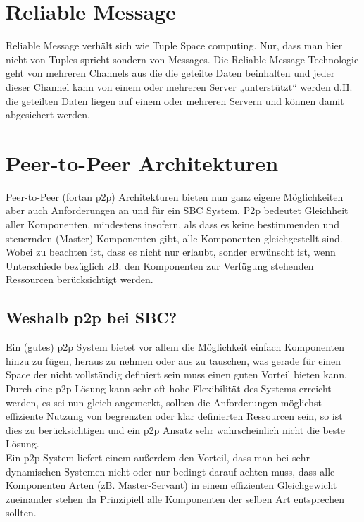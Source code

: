 \documentclass[a4paper,12pt]{scrreprt}
\begin{document}
		\section{Reliable Message}
			
			Reliable Message verhält sich wie Tuple Space computing. Nur, dass man hier nicht von Tuples spricht sondern von Messages.  Die Reliable Message Technologie geht von mehreren Channels aus die die geteilte Daten beinhalten und jeder dieser Channel kann von einem oder mehreren Server „unterstützt“ werden d.H. die geteilten Daten liegen auf einem oder mehreren Servern und können damit abgesichert werden. 
		
		\section{Peer-to-Peer Architekturen}
			
			Peer-to-Peer (fortan p2p) Architekturen bieten nun ganz eigene Möglichkeiten aber auch Anforderungen an und für ein SBC System. P2p bedeutet Gleichheit aller Komponenten, mindestens insofern, als dass es keine bestimmenden und steuernden (Master) Komponenten gibt, alle Komponenten gleichgestellt sind. Wobei zu beachten ist, dass es nicht nur erlaubt, sonder erwünscht ist, wenn Unterschiede bezüglich zB. den Komponenten zur Verfügung stehenden Ressourcen berücksichtigt werden. 
			
			\subsection{Weshalb p2p bei SBC?}
				
				Ein (gutes) p2p System bietet vor allem die Möglichkeit einfach Komponenten hinzu zu fügen, heraus zu nehmen oder aus zu tauschen, was gerade für einen Space der nicht vollständig definiert sein muss einen guten Vorteil bieten kann. Durch eine p2p Lösung kann sehr oft hohe Flexibilität des Systems erreicht werden, es sei nun gleich angemerkt, sollten die Anforderungen möglichst effiziente Nutzung von begrenzten oder klar definierten Ressourcen sein, so ist dies zu berücksichtigen und ein p2p Ansatz sehr wahrscheinlich nicht die beste Lösung. \\
				Ein p2p System liefert einem außerdem den Vorteil, dass man bei sehr dynamischen Systemen nicht oder nur bedingt darauf achten muss, dass alle Komponenten Arten (zB. Master-Servant) in einem effizienten Gleichgewicht zueinander stehen da Prinzipiell alle Komponenten der selben Art entsprechen sollten.
				
\end{document}
